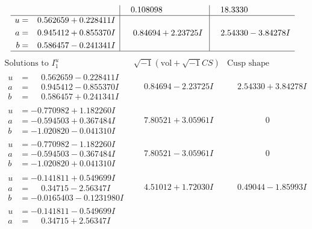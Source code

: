 \documentclass[1p]{elsarticle_modified}
\theoremstyle{definition}
\newcommand{\I}{\sqrt{-1}}
\begin{document}
$$\begin{array}{c|c|c}
 & \phantom{-}0.108098\phantom{ +0.000000I} & \phantom{-}18.3330\phantom{ +0.000000I} \\ \hline\begin{aligned}
u &= \phantom{-}0.562659 + 0.228411 I \\
a &= \phantom{-}0.945412 + 0.855370 I \\
b &= \phantom{-}0.586457 - 0.241341 I\end{aligned}
 & \phantom{-}0.84694 + 2.23725 I & \phantom{-}2.54330 - 3.84278 I\\
 \hline 
 \end{array}$$\newpage$$\begin{array}{c|c|c}  
\text{Solutions to }I^u_{1}& \I (\text{vol} + \sqrt{-1}CS) & \text{Cusp shape}\\
 \hline 
\begin{aligned}
u &= \phantom{-}0.562659 - 0.228411 I \\
a &= \phantom{-}0.945412 - 0.855370 I \\
b &= \phantom{-}0.586457 + 0.241341 I\end{aligned}
 & \phantom{-}0.84694 - 2.23725 I & \phantom{-}2.54330 + 3.84278 I \\ \hline\begin{aligned}
u &= -0.770982 + 1.182260 I \\
a &= -0.594503 + 0.367484 I \\
b &= -1.020820 - 0.041310 I\end{aligned}
 & \phantom{-}7.80521 + 3.05961 I & \phantom{-0.000000 } 0 \\ \hline\begin{aligned}
u &= -0.770982 - 1.182260 I \\
a &= -0.594503 - 0.367484 I \\
b &= -1.020820 + 0.041310 I\end{aligned}
 & \phantom{-}7.80521 - 3.05961 I & \phantom{-0.000000 } 0 \\ \hline\begin{aligned}
u &= -0.141811 + 0.549699 I \\
a &= \phantom{-}0.34715 - 2.56347 I \\
b &= -0.0165403 - 0.1231980 I\end{aligned}
 & \phantom{-}4.51012 + 1.72030 I & \phantom{-}0.49044 - 1.85993 I \\ \hline\begin{aligned}
u &= -0.141811 - 0.549699 I \\
a &= \phantom{-}0.34715 + 2.56347 I \\

\end{aligned}
\end{array}$$
\end{document}
